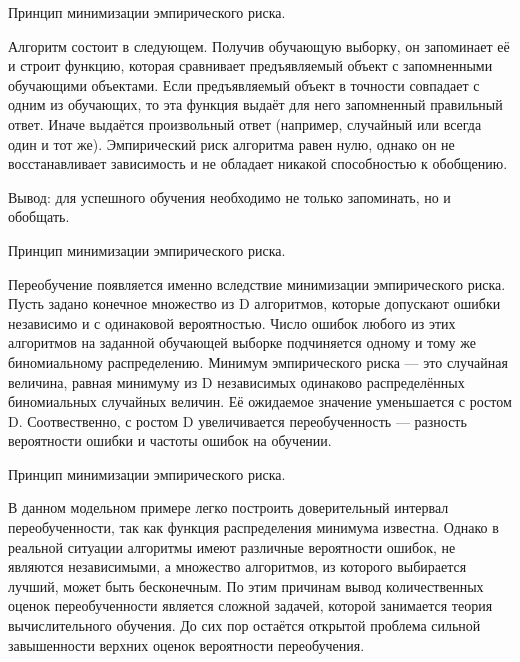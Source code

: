 \documentclass[10pt,pdf,hyperref={unicode}]{beamer}
\begin{document}
\begin{frame}{Принцип минимизации эмпирического риска.}

Алгоритм состоит в следующем. Получив обучающую выборку, он запоминает её и строит функцию,
 которая сравнивает предъявляемый объект с запомненными обучающими объектами. 
 Если предъявляемый объект в точности совпадает с одним из обучающих, то эта функция 
 выдаёт для него запомненный правильный ответ. Иначе выдаётся произвольный ответ (например, случайный или всегда один и тот же). 
 Эмпирический риск алгоритма равен нулю, однако он не восстанавливает зависимость и не обладает никакой способностью к обобщению.

Вывод: для успешного обучения необходимо не только запоминать, но и обобщать.

\end{frame}

\begin{frame}{Принцип минимизации эмпирического риска.}


 Переобучение появляется именно вследствие минимизации эмпирического риска. Пусть задано конечное множество из D алгоритмов, 
которые допускают ошибки независимо и с одинаковой вероятностью. Число ошибок любого из этих алгоритмов 
на заданной обучающей выборке подчиняется одному и тому же биномиальному распределению.
 Минимум эмпирического риска — это случайная величина, равная минимуму из D 
 независимых одинаково распределённых биномиальных случайных величин. 
 Её ожидаемое значение уменьшается с ростом D. Соотвественно, с ростом D увеличивается 
 переобученность — разность вероятности ошибки и частоты ошибок на обучении.
 
\end{frame}

\begin{frame}{Принцип минимизации эмпирического риска.}

В данном модельном примере легко построить доверительный интервал переобученности, так как функция распределения минимума известна.
 Однако в реальной ситуации алгоритмы имеют различные вероятности ошибок, не являются независимыми,
  а множество алгоритмов, из которого выбирается лучший, может быть бесконечным.
   По этим причинам вывод количественных оценок переобученности является сложной задачей,
    которой занимается теория вычислительного обучения. До сих пор остаётся открытой 
    проблема сильной завышенности верхних оценок вероятности переобучения.
    
\end{frame}
\end{document}
